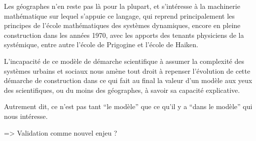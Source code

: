 Les géographes n'en reste pas là pour la plupart, et s'intéresse à la machinerie mathématique sur lequel s'appuie ce langage, qui reprend principalement les principes de l'école mathématiques des systèmes dynamiques, encore en pleine construction dans les années 1970, avec les apports des tenants physiciens de la systémique, entre autre l'école de Prigogine et l'école de Haiken.



L'incapacité de ce modèle de démarche scientifique à assumer la complexité des systèmes urbains et sociaux nous amène tout droit à repenser l'évolution de cette démarche de construction dans ce qui fait au final la valeur d'un modèle aux yeux des scientifiques, ou du moins des géographes, à savoir sa capacité explicative.

Autrement dit, ce n'est pas tant \enquote{le modèle} que ce qu'il y a \enquote{dans le modèle} qui nous intéresse. \autocite{Sanders2000} 

=> Validation comme nouvel enjeu ?

